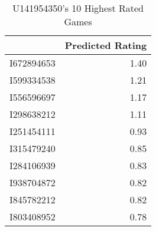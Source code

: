 \begin{table}[ht]
\centering
\caption{U141954350's 10 Highest Rated Games} 
\label{tab:highest}
\begin{tabular}{rr}
  \hline
 & Predicted Rating \\ 
  \hline
I672894653 & 1.40 \\ 
  I599334538 & 1.21 \\ 
  I556596697 & 1.17 \\ 
  I298638212 & 1.11 \\ 
  I251454111 & 0.93 \\ 
  I315479240 & 0.85 \\ 
  I284106939 & 0.83 \\ 
  I938704872 & 0.82 \\ 
  I845782212 & 0.82 \\ 
  I803408952 & 0.78 \\ 
   \hline
\end{tabular}
\end{table}
